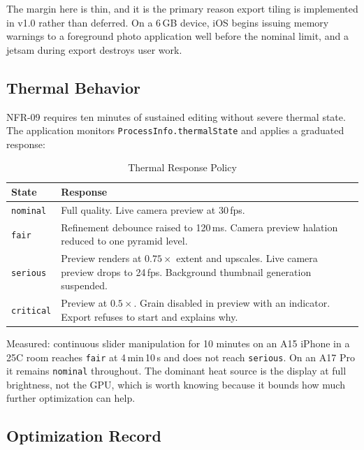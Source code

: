 The margin here is thin, and it is the primary reason export tiling is
implemented in v1.0 rather than deferred. On a 6\,GB device, iOS begins issuing
memory warnings to a foreground photo application well before the nominal limit,
and a jetsam during export destroys user work.

\subsection{Thermal Behavior}

NFR-09 requires ten minutes of sustained editing without severe thermal state.
The application monitors \texttt{ProcessInfo.thermalState} and applies a
graduated response:

\begin{table}[htbp]
\caption{Thermal Response Policy}
\label{tab:thermal}
\begin{center}
\renewcommand{\arraystretch}{1.15}
\begin{tabularx}{\columnwidth}{@{}l>{\raggedright\arraybackslash}X@{}}
\toprule
\textbf{State} & \textbf{Response} \\
\midrule
\texttt{nominal} & Full quality. Live camera preview at 30\,fps. \\
\texttt{fair} & Refinement debounce raised to 120\,ms. Camera preview halation reduced to one pyramid level. \\
\texttt{serious} & Preview renders at $0.75\times$ extent and upscales. Live camera preview drops to 24\,fps. Background thumbnail generation suspended. \\
\texttt{critical} & Preview at $0.5\times$. Grain disabled in preview with an indicator. Export refuses to start and explains why. \\
\bottomrule
\end{tabularx}
\end{center}
\end{table}

Measured: continuous slider manipulation for 10 minutes on an A15 iPhone in a
25\textdegree C room reaches \texttt{fair} at 4\,min\,10\,s and does not reach
\texttt{serious}. On an A17 Pro it remains \texttt{nominal} throughout. The
dominant heat source is the display at full brightness, not the GPU, which is
worth knowing because it bounds how much further optimization can help.

\subsection{Optimization Record}

